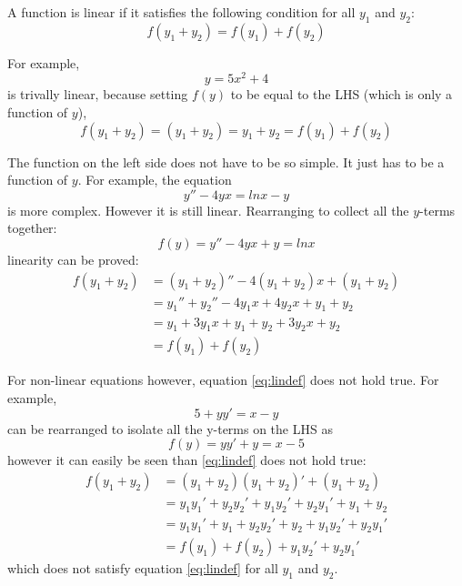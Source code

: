 A function is linear if it satisfies the following condition for all $y_1$ and $y_2$:
\begin{equation}
    \label{eq:lindef}
    f(y_1 + y_2)  = f(y_1) + f(y_2)
\end{equation}

For example,
\begin{equation*}
    y = 5x^2 + 4
\end{equation*}
is trivally linear, because setting $f(y)$ to be equal to the LHS (which is only a function of $y$),
\begin{equation*}
    f(y_1 + y_2) = (y_1+y_2) = y_1 + y_2 = f(y_1) + f(y_2)
\end{equation*}

The function on the left side does not have to be so simple. It just has to be a function of $y$. For example, the equation
\begin{equation*}
    y'' - 4yx = ln x - y
\end{equation*}
is more complex. However it is still linear. Rearranging to collect all the $y$-terms together:
\begin{equation*}
    f(y) = y'' - 4yx + y = ln x
\end{equation*}
linearity can be proved:
\begin{align*}
    f(y_1 + y_2) &= (y_1 + y_2)'' - 4(y_1 + y_2)x + (y_1 + y_2) \\
                 &= y_1''+ y_2'' - 4y_1x + 4y_2x + y_1 + y_2 \\
                 &= y_1 + 3y_1x + y_1 + y_2 + 3y_2x + y_2 \\
                 &= f(y_1) + f(y_2)
\end{align*}

For non-linear equations however, equation \ref{eq:lindef} does not hold true. For example,
\begin{equation*}
    5 + yy' = x - y
\end{equation*}
can be rearranged to isolate all the y-terms on the LHS as
\begin{equation*}
    f(y) = yy' + y = x - 5
\end{equation*}
however it can easily be seen than \ref{eq:lindef} does not hold true:
\begin{align*}
    f(y_1 + y_2) &= (y_1 + y_2)(y_1+y_2)' + (y_1 + y_2) \\
                 &= y_1 y_1' + y_2 y_2' + y_1 y_2' + y_2 y_1' + y_1 + y_2 \\
                 &= y_1 y_1' + y_1 + y_2 y_2' + y_2 + y_1 y_2' + y_2 y_1' \\
                 &= f(y_1) + f(y_2) + y_1 y_2' + y_2 y_1'
\end{align*}
which does not satisfy equation \ref{eq:lindef} for all $y_1$ and $y_2$.

